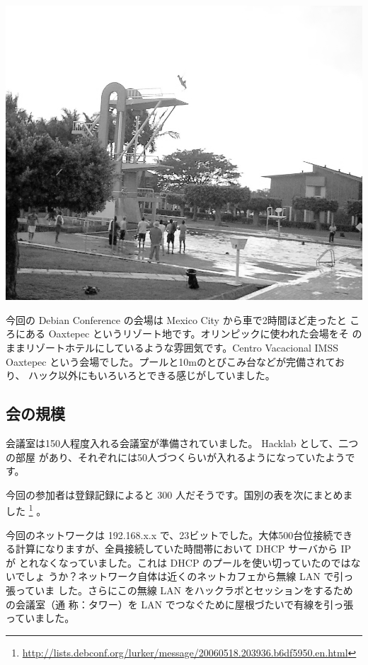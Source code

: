 \documentclass[mingoth,a4paper]{jsarticle}
\begin{document}
\begin{minipage}{0.5\hsize}
\includegraphics[width=0.9\hsize]{image200606/jumping.png}
\end{minipage}
\begin{minipage}{0.5\hsize}
今回の Debian Conference の会場は Mexico City から車で2時間ほど走ったと
ころにある Oaxtepec というリゾート地です。オリンピックに使われた会場をそ
のままリゾートホテルにしているような雰囲気です。Centro Vacacional IMSS
Oaxtepec という会場でした。プールと10mのとびこみ台などが完備されており、
ハック以外にもいろいろとできる感じがしていました。

\end{minipage}

\subsection{会の規模}

会議室は150人程度入れる会議室が準備されていました。 Hacklab として、二つの部屋
があり、それぞれには50人づつくらいが入れるようになっていたようです。

今回の参加者は登録記録によると 300 人だそうです。国別の表を次にまとめま
した
\footnote{\url{http://lists.debconf.org/lurker/message/20060518.203936.b6df5950.en.html}} 
。

今回のネットワークは 192.168.x.x で、23ビットでした。大体500台位接続でき
る計算になりますが、全員接続していた時間帯において DHCP サーバから IP が
とれなくなっていました。これは DHCP のプールを使い切っていたのではないでしょ
うか？ネットワーク自体は近くのネットカフェから無線 LAN で引っ張っていま
した。さらにこの無線 LAN をハックラボとセッションをするための会議室（通
称：タワー）を LAN でつなぐために屋根づたいで有線を引っ張っていました。
\end{document}
